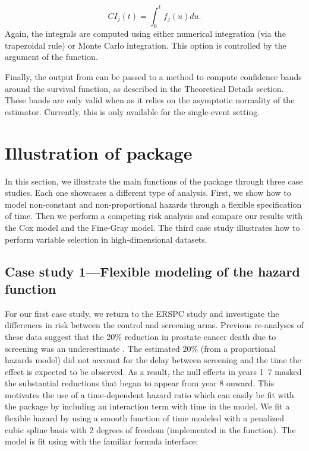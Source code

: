 \[ CI_j(t) = \int_0^t f_j(u)du.\] Again, the integrals are computed
using either numerical integration (via the trapezoidal rule) or Monte
Carlo integration. This option is controlled by the argument
 of the  function.

Finally, the output from  can be passed to a method
 to compute confidence bands around the survival function,
as described in the Theoretical Details section. These bands are only
valid when  as it relies on the asymptotic
normality of the estimator. Currently, this is only available for the
single-event setting.

\hypertarget{illustration-of-package}{%
\section{Illustration of package}\label{illustration-of-package}}

In this section, we illustrate the main functions of the 
package through three case studies. Each one showcases a different type
of analysis. First, we show how to model non-constant and
non-proportional hazards through a flexible specification of time. Then
we perform a competing risk analysis and compare our results with the
Cox model and the Fine-Gray model. The third case study illustrates how
to perform variable selection in high-dimensional datasets.

\hypertarget{case-study-1flexible-modeling-of-the-hazard-function}{%
\subsection{Case study 1---Flexible modeling of the hazard
function}\label{case-study-1flexible-modeling-of-the-hazard-function}}

For our first case study, we return to the ERSPC study and investigate
the differences in risk between the control and screening arms. Previous
re-analyses of these data suggest that the 20\% reduction in prostate
cancer death due to screening was an underestimate
\citep{hanley2010mortality}. The estimated 20\% (from a proportional
hazards model) did not account for the delay between screening and the
time the effect is expected to be observed. As a result, the null
effects in years 1--7 masked the substantial reductions that began to
appear from year 8 onward. This motivates the use of a time-dependent
hazard ratio which can easily be fit with the  package by
including an interaction term with time in the model. We fit a flexible
hazard by using a smooth function of time modeled with a penalized cubic
spline basis with 2 degrees of freedom (implemented in the
 function). The model is fit using
 with the familiar formula interface:

